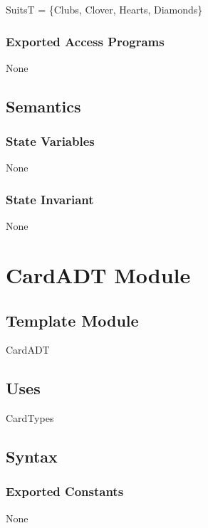 \documentclass[12pt,fleqn]{article}
\begin{document}
SuitsT = \{Clubs, Clover, Hearts, Diamonds\}\\

\subsubsection* {Exported Access Programs}

None

\subsection* {Semantics}

\subsubsection* {State Variables}

None

\subsubsection* {State Invariant}

None


\newpage

\section* {CardADT Module}

\subsection* {Template Module}

CardADT

\subsection* {Uses}

CardTypes

\subsection* {Syntax}

\subsubsection* {Exported Constants}

None
\end{document}
